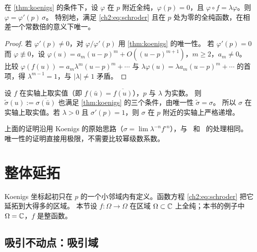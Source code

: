 \begin{corollary}\label{ch2:cor:schroder-unique}
在 \cref{thm:koenigs} 的条件下，设 $\varphi$ 在 $p$ 附近全纯，$\varphi(p)=0$，且 $\varphi\circ f=\lambda\varphi$。则 $\varphi=\varphi'(p)\,\sigma$。
特别地，满足 \eqref{ch2:eq:schroder} 且在 $p$ 处为零的全纯函数，在相差一个常数倍的意义下唯一。
\end{corollary}

\begin{proof}
若 $\varphi'(p)\ne0$，对 $\varphi/\varphi'(p)$ 用 \cref{thm:koenigs} 的唯一性。
若 $\varphi'(p)=0$ 而 $\varphi\not\equiv0$，设 $\varphi(u)=a_m(u-p)^m+O((u-p)^{m+1})$，$m\ge2$，$a_m\ne0$。
比较 $\varphi(f(u))=a_m\lambda^m(u-p)^m+\cdots$ 与 $\lambda\varphi(u)=\lambda a_m(u-p)^m+\cdots$ 的首项，得 $\lambda^{m-1}=1$，与 $|\lambda|\ne1$ 矛盾。
\end{proof}

\begin{remark}[实结构]\label{ch2:rem:real-sigma}
设 $f$ 在实轴上取实值（即 $f(\bar u)=\overline{f(u)}$），$p$ 与 $\lambda$ 为实数。
则 $\tilde\sigma(u):=\overline{\sigma(\bar u)}$ 也满足 \cref{thm:koenigs} 的三个条件，由唯一性 $\tilde\sigma=\sigma$。
所以 $\sigma$ 在实轴上取实值。若 $\lambda>0$ 且 $\sigma'(p)=1$，则 $\sigma$ 在 $p$ 附近的实轴上严格递增。
\end{remark}

\begin{remark}[关于引用]\label{ch2:rem:koenigs-references}
上面的证明沿用 Koenigs 的原始思路（$\sigma=\lim\lambda^{-n}f^{\circ n}$），与~\cite[\S8，Theorem~8.2]{Milnor2006} 和~\cite[Ch.~II]{CarlesonGamelin1993} 的处理相同。
唯一性的证明直接用极限，不需要比较幂级数系数。
\end{remark}

\section{整体延拓}\label{ch2:sec:global}

Koenigs 坐标起初只在 $p$ 的一个小邻域内有定义。函数方程 \eqref{ch2:eq:schroder} 把它延拓到大得多的区域。
本节设 $f:\Omega\to\Omega$ 在区域 $\Omega\subset\mathbb{C}$ 上全纯；本书的例子中 $\Omega=\mathbb{C}$，$f$ 是整函数。

\subsection{吸引不动点：吸引域}

